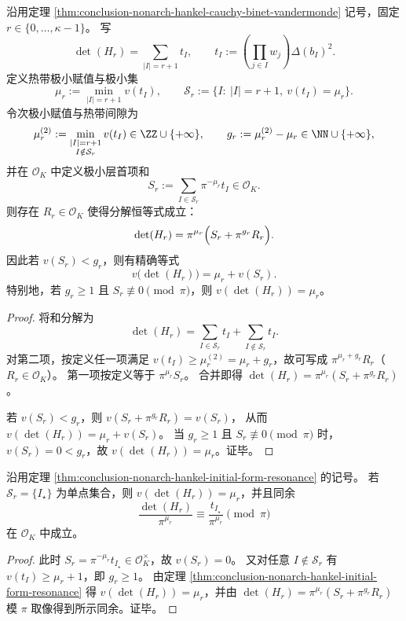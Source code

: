 \begin{theorem}\label{thm:conclusion-nonarch-hankel-initial-form-resonance}
沿用定理 \ref{thm:conclusion-nonarch-hankel-cauchy-binet-vandermonde} 记号，固定 \(r\in\{0,\dots,\kappa-1\}\)。
写
\[
\det(H_r)=\sum_{|I|=r+1}t_I,\qquad
t_I:=\left(\prod_{j\in I}w_j\right)\Delta(b_I)^2.
\]
定义热带极小赋值与极小集
\[
\mu_r:=\min_{|I|=r+1}v(t_I),\qquad
\mathcal S_r:=\{I:\ |I|=r+1,\ v(t_I)=\mu_r\}.
\]
令次极小赋值与热带间隙为
\[
\mu_r^{(2)}:=\min_{\substack{|I|=r+1\\ I\notin\mathcal S_r}}v(t_I)\in\ZZ\cup\{+\infty\},
\qquad
g_r:=\mu_r^{(2)}-\mu_r\in\NN\cup\{+\infty\},
\]
并在 \(\mathcal O_K\) 中定义极小层首项和
\[
S_r:=\sum_{I\in\mathcal S_r}\pi^{-\mu_r}t_I\in\mathcal O_K.
\]
则存在 \(R_r\in\mathcal O_K\) 使得分解恒等式成立：
\[
\det(H_r)=\pi^{\mu_r}\Bigl(S_r+\pi^{g_r}R_r\Bigr).
\]
因此若 \(v(S_r)<g_r\)，则有精确等式
\[
\boxed{\;v\!\bigl(\det(H_r)\bigr)=\mu_r+v(S_r).\;}
\]
特别地，若 \(g_r\ge 1\) 且 \(S_r\not\equiv 0\pmod{\pi}\)，则 \(v(\det(H_r))=\mu_r\)。
\end{theorem}
\begin{proof}
将和分解为
\[
\det(H_r)
=
\sum_{I\in\mathcal S_r}t_I
+
\sum_{I\notin\mathcal S_r}t_I.
\]
对第二项，按定义任一项满足 \(v(t_I)\ge \mu_r^{(2)}=\mu_r+g_r\)，故可写成 \(\pi^{\mu_r+g_r}R_r\)（\(R_r\in\mathcal O_K\)）。
第一项按定义等于 \(\pi^{\mu_r}S_r\)。
合并即得
\(
\det(H_r)=\pi^{\mu_r}(S_r+\pi^{g_r}R_r)
\)。
\par
若 \(v(S_r)<g_r\)，则
\(
v(S_r+\pi^{g_r}R_r)=v(S_r)
\)，
从而
\(
v(\det(H_r))=\mu_r+v(S_r)
\)。
当 \(g_r\ge 1\) 且 \(S_r\not\equiv 0\pmod{\pi}\) 时，\(v(S_r)=0<g_r\)，故 \(v(\det(H_r))=\mu_r\)。证毕。
\end{proof}

\begin{corollary}[唯一极小项的无消去刚性]\label{cor:conclusion-nonarch-hankel-unique-minimizer-no-cancel}
沿用定理 \ref{thm:conclusion-nonarch-hankel-initial-form-resonance} 的记号。
若 \(\mathcal S_r=\{I_\star\}\) 为单点集合，则 \(v(\det(H_r))=\mu_r\)，并且同余
\[
\frac{\det(H_r)}{\pi^{\mu_r}}
\equiv
\frac{t_{I_\star}}{\pi^{\mu_r}}
\pmod{\pi}
\]
在 \(\mathcal O_K\) 中成立。
\end{corollary}
\begin{proof}
此时 \(S_r=\pi^{-\mu_r}t_{I_\star}\in\mathcal O_K^\times\)，故 \(v(S_r)=0\)。
又对任意 \(I\notin\mathcal S_r\) 有 \(v(t_I)\ge \mu_r+1\)，即 \(g_r\ge 1\)。
由定理 \ref{thm:conclusion-nonarch-hankel-initial-form-resonance} 得 \(v(\det(H_r))=\mu_r\)，并由
\(
\det(H_r)=\pi^{\mu_r}(S_r+\pi^{g_r}R_r)
\)
模 \(\pi\) 取像得到所示同余。证毕。
\end{proof}

